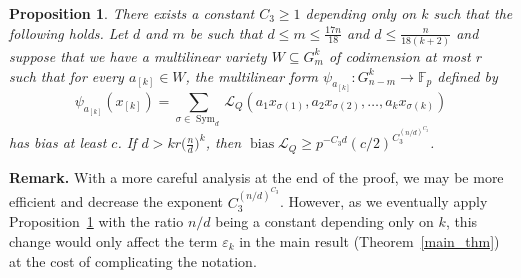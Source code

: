 \documentclass[a4paper,11pt]{article}
\newtheorem{proposition}[theorem]{Proposition}
\theoremstyle{definition}
\newcommand{\on}[1]{
	\operatorname{#1}
}
\begin{document}
\begin{proposition}\label{psitolqlargebiasstep}
    There exists a constant $C_{3} \geq 1$ depending only on $k$ such that the following holds. Let $d$ and $m$ be such that $d \leq m \leq \frac{17n}{18}$ and $d \leq \frac{n}{18(k+2)}$ and suppose that we have a multilinear variety $W \subseteq G_m^k$ of codimension at most $r$ such that for every $a_{[k]} \in W$, the multilinear form $\psi_{a_{[k]}} : G_{n-m} ^k \to \mathbb{F}_p$ defined by
    \[\psi_{a_{[k]}}(x_{[k]}) = \sum_{\sigma \in \on{Sym}_d} \mathcal{L}_Q (a_1x_{\sigma(1)}, a_2 x_{\sigma(2)},\dots, a_k x_{\sigma(k)})\]
    has bias at least $c$. If $d > k r \Big(\frac{n}{d}\Big)^k$, then $\on{bias} \mathcal{L}_Q \geq p^{-C_3 d} (c/2)^{C_3^{(n/d)^{C_3}}}$.
\end{proposition}

\noindent\textbf{Remark.} With a more careful analysis at the end of the proof, we may be more efficient and decrease the exponent $C_3^{(n/d)^{C_3}}$. However, as we eventually apply Proposition~\ref{psitolqlargebiasstep} with the ratio $n/d$ being a constant depending only on $k$, this change would only affect the term $\varepsilon_k$ in the main result (Theorem~\ref{main_thm}) at the cost of complicating the notation.
\end{document}

